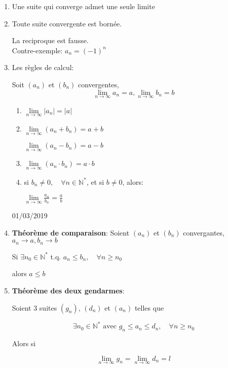 \documentclass[
    11pt,
    a4paper,
    oneside,
    headinlcude, footinclude,
    twoside,
]{report}
\newcommand{\myImplies}[0]{\rightarrow}
\newcommand{\tq}[0]{\textrm{ t.q. }}
\newcommand{\markDate}[1]{\begin{flushright}#1\end{flushright}}
\begin{document}
\begin{enumerate}
\item Une suite qui converge admet une seule limite
\item Toute suite convergente est bornée.

La reciproque est fausse.\\ Contre-exemple: $a_{n} = (-1)^{n}$

\item Les règles de calcul:

Soit $(a_{n})$ et $(b_{n})$ convergentes,\\
$$ \lim_{n \to \infty} a_{n} = a, \lim_{n \to \infty} b_{n} = b $$
\begin{enumerate}
\item $ \lim\limits_{n \to \infty} |a_{n}| = |a|$

\item $ \lim\limits_{n \to \infty} (a_{n} + b_{n}) = a + b$

$ \lim\limits_{n \to \infty} (a_{n} - b_{n}) = a - b$

\item $ \lim\limits_{n \to \infty} (a_{n} \cdot b_{n}) = a \cdot b$

\item si $b_{n} \neq 0, \quad \forall n \in \mathbb{N}^{\ast}$, et
si $b \neq 0$,  alors:

$ \lim\limits_{n \to \infty} \frac{a_{n}}{b_{n}} = \frac{a}{b}$
\end{enumerate}

\markDate{01/03/2019}

\item \textbf{Théorème de comparaison}:
Soient $(a_{n})$ et $(b_{n})$ convergantes, $a_{n} \myImplies a, b_{n}
\myImplies b$

\begin{center}
Si $\exists n _{0} \in \mathbb{N}^{*} \tq a_{n} \leq b_{n}, \quad
\forall n \geq n_{0}$

alors $a \leq b$
\end{center}

\item \textbf{Théorème des deux gendarmes}:

Soient 3 suites $(g_{n})$, $(d_{n})$ et $(a_{n})$ telles que

$$\exists n_{0} \in \mathbb{N}^{*} \textrm{ avec } g_{n} \leq a_{n} \leq
d_{n}, \quad \forall n \geq n_{0}$$

Alors si

$$ \lim_{n \to \infty}  g_{n} = \lim_{n \to \infty} d_{n} = l$$


\end{enumerate}
\end{document}
